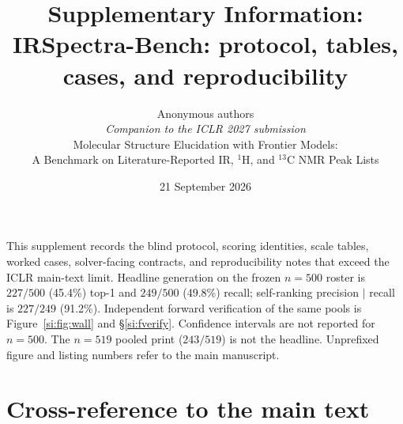 \documentclass[11pt]{article}
\title{Supplementary Information:\\
IRSpectra-Bench: protocol, tables, cases, and reproducibility}
\author{Anonymous authors\\[2pt]
\textit{Companion to the ICLR 2027 submission}\\
Molecular Structure Elucidation with Frontier Models:\\
A Benchmark on Literature-Reported IR, $^1$H, and $^{13}$C NMR Peak Lists}
\date{21 September 2026}
\newcounter{listing}
\begin{document}
\maketitle

\noindent
This supplement records the blind protocol, scoring identities, scale
tables, worked cases, solver-facing contracts, and reproducibility notes
that exceed the ICLR main-text limit.
Headline generation on the frozen $n{=}500$ roster is $227/500$ (45.4\%)
top-1 and $249/500$ (49.8\%) recall; self-ranking precision $|$ recall is
$227/249$ (91.2\%).
Independent forward verification of the same pools is Figure~\ref{si:fig:wall}
and \S\ref{si:fverify}.
Confidence intervals are not reported for $n{=}500$.
The $n{=}519$ pooled print ($243/519$) is not the headline.
Unprefixed figure and listing numbers refer to the main manuscript.

\tableofcontents
\vspace{1em}

\renewcommand{\thefigure}{S\arabic{figure}}
\renewcommand{\thetable}{S\arabic{table}}
\renewcommand{\theequation}{S\arabic{equation}}

\section{Cross-reference to the main text}
\label{si:map}
\end{document}
